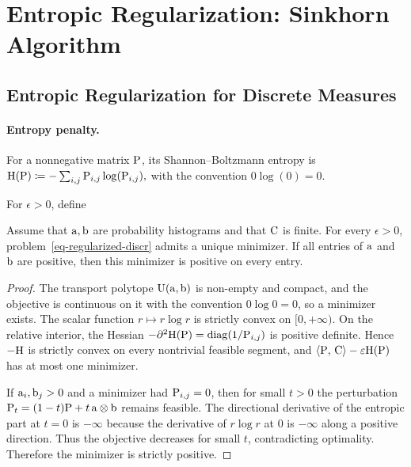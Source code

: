 \section{Entropic Regularization: Sinkhorn Algorithm}
\label{sec-sinkhorn}
\subsection{Entropic Regularization for Discrete Measures}
\label{sec-entropic-discrete}
\paragraph{Entropy penalty.}
\begin{defn}\label{def-discrete-shannon-boltzmann-entropy}
For a nonnegative matrix $\P$, its Shannon--Boltzmann entropy is \(\HD(\P) \eqdef -\sum_{i,j} \P_{i,j} \log(\P_{i,j}),\)
with the convention $0\log(0)=0$.
\end{defn}
\begin{defn}\label{def-discrete-entropic-ot}
For $\epsilon>0$, define
\end{defn}
\begin{prop}\label{prop-entropic-unique}
Assume that $\a,\b$ are probability histograms and that $\C$ is finite. For every $\epsilon>0$, problem~\eqref{eq-regularized-discr} admits a unique minimizer. If all entries of $\a$ and $\b$ are positive, then this minimizer is positive on every entry.
\end{prop}
\begin{proof}
The transport polytope $\CouplingsD(\a,\b)$ is non-empty and compact, and the objective is continuous on it with the convention $0\log0=0$, so a minimizer exists. The scalar function $r\mapsto r\log r$ is strictly convex on $[0,+\infty)$. On the relative interior, the Hessian
\(-\partial^2 \HD(\P)=\diag(1/\P_{i,j})\)
is positive definite. Hence $-\HD$ is strictly convex on every nontrivial feasible segment, and $\dotp{\P}{\C}-\epsilon\HD(\P)$ has at most one minimizer.

If $\a_i,\b_j>0$ and a minimizer had $\P_{i,j}=0$, then for small $t>0$ the perturbation $\P_t=(1-t)\P+t\,\a\otimes\b$ remains feasible. The directional derivative of the entropic part at $t=0$ is $-\infty$ because the derivative of $r\log r$ at $0$ is $-\infty$ along a positive direction. Thus the objective decreases for small $t$, contradicting optimality. Therefore the minimizer is strictly positive.
\end{proof}
